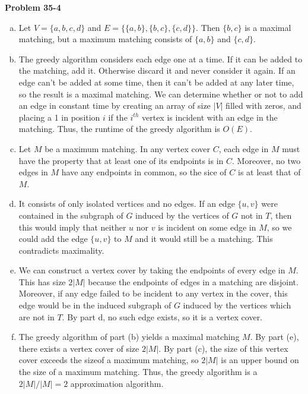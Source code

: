 \documentclass{article}
\begin{document}
\noindent\textbf{Problem 35-4}
\begin{enumerate}[a.]
\item Let $V = \{a, b, c, d\}$ and $E = \{ \{a, b\}, \{b, c\}, \{c, d\}\}$. Then $\{b,c\}$ is a maximal matching, but a maximum matching consists of $\{a,b\}$ and $\{c,d\}$.

\item  The greedy algorithm considers each edge one at a time.  If it can be added to the matching, add it.  Otherwise discard it and never consider it again.  If an edge can't be added at some time, then it can't be added at any later time, so the result is a maximal matching.  We can determine whether or not to add an edge in constant time by creating an array of size $|V|$ filled with zeros, and placing a 1 in position $i$ if the $i^{th}$ vertex is incident with an edge in the matching.  Thus, the runtime of the greedy algorithm is $O(E)$. 

\item Let $M$ be a maximum matching.  In any vertex cover $C$, each edge in $M$ must have the property that at least one of its endpoints is in $C$.  Moreover, no two edges in $M$ have any endpoints in common, so the sice of $C$ is at least that of $M$. 

\item It consists of only isolated vertices and no edges.  If an edge $\{u,v\}$ were contained in the subgraph of $G$ induced by the vertices of $G$ not in $T$, then this would imply that neither $u$ nor $v$ is incident on some edge in $M$, so we could add the edge $\{u,v\}$ to $M$ and it would still be a matching.  This contradicts maximality.

\item We can construct a vertex cover by taking the endpoints of every edge in $M$.  This has size $2|M|$ because the endpoints of edges in a matching are disjoint.  Moreover, if any edge failed to be incident to any vertex in the cover, this edge would be in the induced subgraph of $G$ induced by the vertices which are not in $T$. By part d, no such edge exists, so it is a vertex cover.

\item The greedy algorithm of part (b) yields a maximal matching $M$.  By part (e), there exists a vertex cover of size $2|M|$.  By part (c), the size of this vertex cover exceeds the sizeof a maximum matching, so $2|M|$ is an upper bound on the size of a maximum matching. Thus, the greedy algorithm is a $2|M|/|M| = 2$ approximation algorithm.

\end{enumerate}
\end{document}
